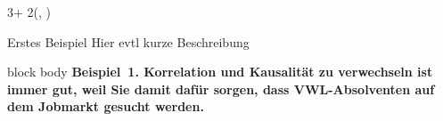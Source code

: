 \documentclass{beamer}
\newlength{\blockOne}
\newlength{\blockTwo}
\begin{document}
\begin{frame}[t]




\begin{textblock*}{3\colwidth + 2\colsep}(\leftmargin, \blockTwo)

\begin{alertblock}{%
	\begin{minipage}[b]{60pt}
		\RaggedRight
		\noindent\hspace{-10pt}
	\end{minipage}%
	\begin{minipage}[b]{3\colwidth+2\colsep-125pt}\strut%
		Erstes Beispiel \;
		{\mdseries Hier evtl kurze Beschreibung}
	\end{minipage}%
}
	\vspace{-0.25cm}
	\begin{minipage}{\textwidth}
		\begin{beamercolorbox}[
			ht = 19.75cm, 
			wd = \linewidth, 
			left
		]{block body}
			\centering\textbf{\boldmath Beispiel~1.\; Korrelation und Kausalität zu verwechseln ist immer gut, weil Sie damit dafür sorgen, dass VWL-Absolventen auf dem Jobmarkt gesucht werden.}\par
		\end{beamercolorbox}
	\end{minipage}%
	\vspace{0.5cm}
\end{alertblock}



\end{textblock*}
\end{frame}
\end{document}

